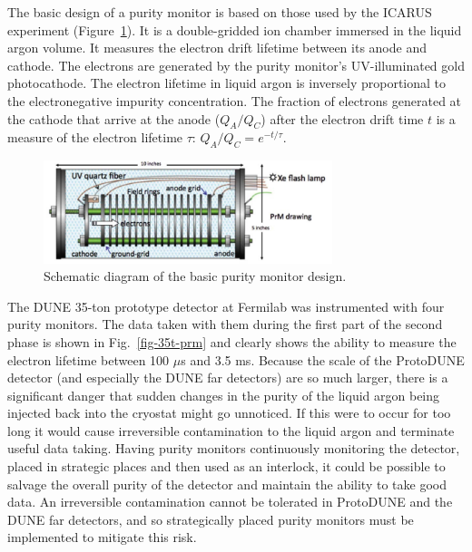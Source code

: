 The basic design of a purity monitor is based on those used by the ICARUS experiment (Figure~\ref{fig:prm}). It is a double-gridded ion chamber immersed in the liquid argon volume. It measures the electron drift lifetime between its anode and cathode. The electrons are generated by the purity monitor's UV-illuminated gold photocathode. The electron lifetime in liquid argon is inversely proportional to the electronegative impurity concentration. The fraction of electrons generated at the cathode that arrive at the anode ($Q_A/Q_C$) after the electron drift time $t$ is a measure of the electron lifetime $\tau$: $Q_A/Q_C=e^{-t/\tau}$.

\begin{figure}[h]
\centering
\includegraphics[height=3cm]{../figures/PrMon_prm.pdf}
\caption{Schematic diagram of the basic purity monitor design.}\label{fig:prm}
\end{figure}

The DUNE 35-ton prototype detector at Fermilab was instrumented with four purity monitors. The data taken with them during the first part of the second phase is shown in Fig.~\ref{fig-35t-prm} and clearly shows the ability to measure the electron lifetime between 100 $\mu$s and 3.5 ms.  Because the scale of the ProtoDUNE detector (and especially the DUNE far detectors) are so much larger, there is a significant danger that sudden changes in the purity of the liquid argon being injected back into the cryostat might go unnoticed. If this were to occur for too long it would cause irreversible contamination to the liquid argon and terminate useful data taking.  Having purity monitors continuously monitoring the detector, placed in strategic places and then used as an interlock, it could be possible to salvage the overall purity of the detector and maintain the ability to take good data. An irreversible contamination cannot be tolerated in ProtoDUNE and the DUNE far detectors, and so strategically placed purity monitors must be implemented to mitigate this risk. 



